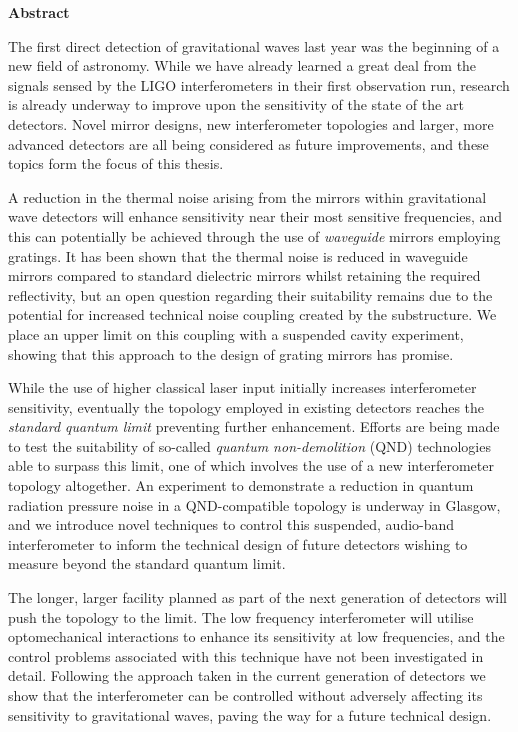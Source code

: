 \begin{preface}
\begin{center} {\bf Abstract}\end{center}

The first direct detection of gravitational waves last year was the beginning of a new field of astronomy. While we have already learned a great deal from the signals sensed by the LIGO interferometers in their first observation run, research is already underway to improve upon the sensitivity of the state of the art detectors. Novel mirror designs, new interferometer topologies and larger, more advanced detectors are all being considered as future improvements, and these topics form the focus of this thesis.

A reduction in the thermal noise arising from the mirrors within gravitational wave detectors will enhance sensitivity near their most sensitive frequencies, and this can potentially be achieved through the use of \emph{waveguide} mirrors employing gratings. It has been shown that the thermal noise is reduced in waveguide mirrors compared to standard dielectric mirrors whilst retaining the required reflectivity, but an open question regarding their suitability remains due to the potential for increased technical noise coupling created by the substructure. We place an upper limit on this coupling with a suspended cavity experiment, showing that this approach to the design of grating mirrors has promise.

While the use of higher classical laser input initially increases interferometer sensitivity, eventually the \MI{} topology employed in existing detectors reaches the \emph{standard quantum limit} preventing further enhancement. Efforts are being made to test the suitability of so-called \emph{quantum non-demolition} (QND) technologies able to surpass this limit, one of which involves the use of a new interferometer topology altogether. An experiment to demonstrate a reduction in quantum radiation pressure noise in a QND-compatible \SSM{} topology is underway in Glasgow, and we introduce novel techniques to control this suspended, audio-band interferometer to inform the technical design of future detectors wishing to measure beyond the standard quantum limit.

The longer, larger \ET{} facility planned as part of the next generation of detectors will push the \MI{} topology to the limit. The low frequency interferometer will utilise optomechanical interactions to enhance its sensitivity at low frequencies, and the control problems associated with this technique have not been investigated in detail. Following the approach taken in the current generation of detectors we show that the interferometer can be controlled without adversely affecting its sensitivity to gravitational waves, paving the way for a future technical design.
\end{preface}